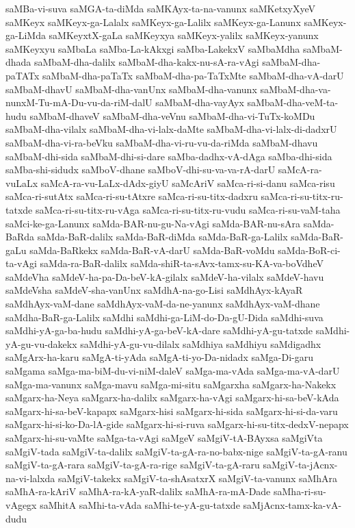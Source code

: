 {saMBa-vi-suva
saMGA-ta-diMda
saMKAyx-ta-na-vanunx
saMKetxyXyeV
saMKeyx
saMKeyx-ga-Lalalx
saMKeyx-ga-Lalilx
saMKeyx-ga-Lanunx
saMKeyx-ga-LiMda
saMKeyxtX-gaLa
saMKeyxya
saMKeyx-yalilx
saMKeyx-yanunx
saMKeyxyu
saMbaLa
saMba-La-kAkxgi
saMba-LakekxV
saMbaMdha
saMbaM-dhada
saMbaM-dha-dalilx
saMbaM-dha-kakx-nu-sA-ra-vAgi
saMbaM-dha-paTATx
saMbaM-dha-paTaTx
saMbaM-dha-pa-TaTxMte
saMbaM-dha-vA-darU
saMbaM-dhavU
saMbaM-dha-vanUnx
saMbaM-dha-vanunx
saMbaM-dha-va-nunxM-Tu-mA-Du-vu-da-riM-dalU
saMbaM-dha-vayAyx
saMbaM-dha-veM-ta-hudu
saMbaM-dhaveV
saMbaM-dha-veVnu
saMbaM-dha-vi-TuTx-koMDu
saMbaM-dha-vilalx
saMbaM-dha-vi-lalx-daMte
saMbaM-dha-vi-lalx-di-dadxrU
saMbaM-dha-vi-ra-beVku
saMbaM-dha-vi-ru-vu-da-riMda
saMbaM-dhavu
saMbaM-dhi-sida
saMbaM-dhi-si-dare
saMba-dadhx-vA-dAga
saMba-dhi-sida
saMba-shi-sidudx
saMboV-dhane
saMboV-dhi-su-va-va-rA-darU
saMcA-ra-vuLaLx
saMcA-ra-vu-LaLx-dAdx-giyU
saMcAriV
saMca-ri-si-danu
saMca-risu
saMca-ri-sutAtx
saMca-ri-su-tAtxre
saMca-ri-su-titx-dadxru
saMca-ri-su-titx-ru-tatxde
saMca-ri-su-titx-ru-vAga
saMca-ri-su-titx-ru-vudu
saMca-ri-su-vaM-taha
saMci-ke-ga-Lanunx
saMda-BAR-nu-gu-Na-vAgi
saMda-BAR-nu-sAra
saMda-BaRda
saMda-BaR-dalilx
saMda-BaR-diMda
saMda-BaR-ga-Lalilx
saMda-BaR-gaLu
saMda-BaRkekx
saMda-BaR-vA-darU
saMda-BaR-voMdu
saMda-BoR-ci-ta-vAgi
saMda-ra-BaR-dalilx
saMda-shiR-ta-sAvx-tamx-su-KA-va-boVdheV
saMdeVha
saMdeV-ha-pa-Da-beV-kA-gilalx
saMdeV-ha-vilalx
saMdeV-havu
saMdeVsha
saMdeV-sha-vanUnx
saMdhA-na-go-Lisi
saMdhAyx-kAyaR
saMdhAyx-vaM-dane
saMdhAyx-vaM-da-ne-yanunx
saMdhAyx-vaM-dhane
saMdha-BaR-ga-Lalilx
saMdhi
saMdhi-ga-LiM-do-Da-gU-Dida
saMdhi-suva
saMdhi-yA-ga-ba-hudu
saMdhi-yA-ga-beV-kA-dare
saMdhi-yA-gu-tatxde
saMdhi-yA-gu-vu-dakekx
saMdhi-yA-gu-vu-dilalx
saMdhiya
saMdhiyu
saMdigadhx
saMgArx-ha-karu
saMgA-ti-yAda
saMgA-ti-yo-Da-nidadx
saMga-Di-garu
saMgama
saMga-ma-biM-du-vi-niM-daleV
saMga-ma-vAda
saMga-ma-vA-darU
saMga-ma-vanunx
saMga-mavu
saMga-mi-situ
saMgarxha
saMgarx-ha-Nakekx
saMgarx-ha-Neya
saMgarx-ha-dalilx
saMgarx-ha-vAgi
saMgarx-hi-sa-beV-kAda
saMgarx-hi-sa-beV-kapapx
saMgarx-hisi
saMgarx-hi-sida
saMgarx-hi-si-da-varu
saMgarx-hi-si-ko-Da-lA-gide
saMgarx-hi-si-ruva
saMgarx-hi-su-titx-dedxV-nepapx
saMgarx-hi-su-vaMte
saMga-ta-vAgi
saMgeV
saMgiV-tA-BAyxsa
saMgiVta
saMgiV-tada
saMgiV-ta-dalilx
saMgiV-ta-gA-ra-no-babx-nige
saMgiV-ta-gA-ranu
saMgiV-ta-gA-rara
saMgiV-ta-gA-ra-rige
saMgiV-ta-gA-raru
saMgiV-ta-jAcnx-na-vi-lalxda
saMgiV-takekx
saMgiV-ta-shAsatxrX
saMgiV-ta-vanunx
saMhAra
saMhA-ra-kAriV
saMhA-ra-kA-yaR-dalilx
saMhA-ra-mA-Dade
saMha-ri-su-vAgegx
saMhitA
saMhi-ta-vAda
saMhi-te-yA-gu-tatxde
saMjAcnx-tamx-ka-vA-dudu
}
